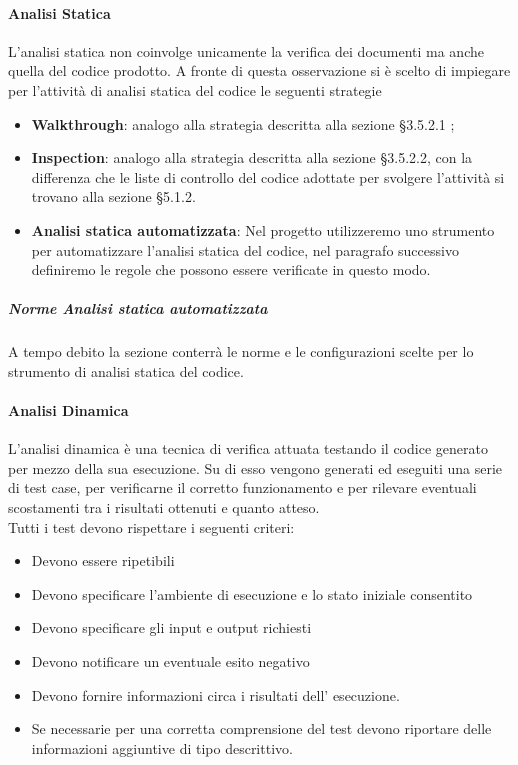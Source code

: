 			\paragraph{Analisi Statica}
				L’analisi statica non coinvolge unicamente la verifica dei documenti ma anche quella del codice prodotto. A fronte di questa osservazione si è scelto di impiegare per l’attività di analisi statica del codice le seguenti strategie
				\begin{itemize}
					\item\textbf{Walkthrough}: analogo alla strategia descritta alla sezione §3.5.2.1 ;
					\item\textbf{Inspection}: analogo alla strategia descritta alla sezione §3.5.2.2, con la differenza che le liste di controllo del codice adottate per svolgere l’attività si trovano alla sezione §5.1.2.
					\item\textbf{Analisi statica automatizzata}: Nel progetto utilizzeremo uno strumento per automatizzare l'analisi statica del codice, nel paragrafo successivo definiremo le regole che possono essere verificate in questo modo.
				\end{itemize}
				\subparagraph{Norme Analisi statica automatizzata}
					A tempo debito la sezione conterrà le norme e le configurazioni scelte per lo strumento di analisi statica del codice.
			\paragraph{Analisi Dinamica}
				L’analisi dinamica è una tecnica di verifica attuata testando il codice generato per mezzo della sua esecuzione. Su di esso vengono generati ed eseguiti una serie di test case, per verificarne il corretto funzionamento e per rilevare eventuali scostamenti tra i risultati ottenuti e quanto atteso. \\
				Tutti i test devono rispettare i seguenti criteri: \\
				\begin{itemize}
					\item Devono essere ripetibili
					\item Devono specificare l’ambiente di esecuzione e lo stato iniziale consentito
					\item Devono specificare gli input e output richiesti
					\item Devono notificare un eventuale esito negativo
					\item Devono fornire informazioni circa i risultati dell’ esecuzione.
					\item Se necessarie per una corretta comprensione del test devono riportare delle informazioni aggiuntive di tipo descrittivo.
				\end{itemize}
